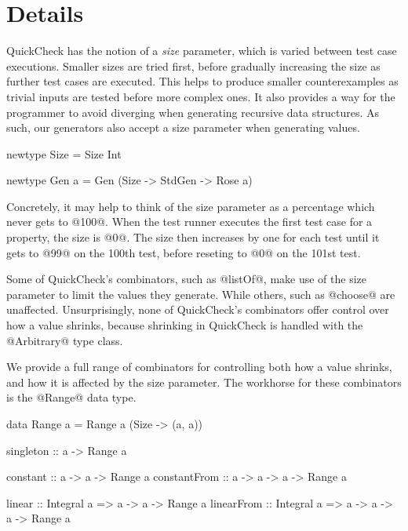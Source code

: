 \section{Details}

QuickCheck has the notion of a \emph{size} parameter, which is varied between test case executions. Smaller sizes are tried first, before gradually increasing the size as further test cases are executed. This helps to produce smaller counterexamples as trivial inputs are tested before more complex ones. It also provides a way for the programmer to avoid diverging when generating recursive data structures. As such, our generators also accept a size parameter when generating values. 

\begin{code}
  newtype Size =
    Size Int

  newtype Gen a =
    Gen (Size -> StdGen -> Rose a)
\end{code}

Concretely, it may help to think of the size parameter as a percentage which never gets to @100@. When the test runner executes the first test case for a property, the size is @0@. The size then increases by one for each test until it gets to @99@ on the 100th test, before reseting to @0@ on the 101st test.

%
%


Some of QuickCheck's combinators, such as @listOf@, make use of the size parameter to limit the values they generate. While others, such as @choose@ are unaffected. Unsurprisingly, none of QuickCheck's combinators offer control over how a value shrinks, because shrinking in QuickCheck is handled with the @Arbitrary@ type class.

We provide a full range of combinators for controlling both how a value shrinks, and how it is affected by the size parameter. The workhorse for these combinators is the @Range@ data type.

\begin{code}
  data Range a =
    Range a (Size -> (a, a))

  singleton    :: a -> Range a

  constant     :: a -> a -> Range a
  constantFrom :: a -> a -> a -> Range a

  linear       :: Integral a => a -> a -> Range a
  linearFrom   :: Integral a => a -> a -> a -> Range a
\end{code}

